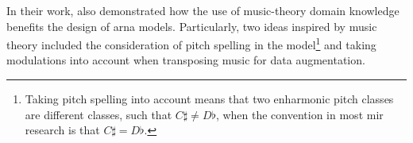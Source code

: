 

In their work, \textcite{micchi2020not} also demonstrated
how the use of music-theory domain knowledge benefits the
design of \gls{arna} models.
Particularly, two ideas inspired by music theory included
the consideration of pitch spelling in the
model\footnote{Taking pitch spelling into account means that
two enharmonic pitch classes are different classes, such
that $C\sharp \neq D\flat$, when the convention in most \gls{mir}
research is that $C\sharp = D\flat$.} and taking modulations
into account when transposing music for data augmentation.
